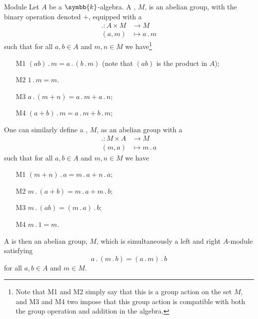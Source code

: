 \documentclass[fleqn]{NotesClass}
\renewcommand{\field}{\symbb{k}}
\newcommand{\action}{\mathbin{.}}
\begin{document}
    \begin{dfn}{Module}{}
        Let \(A\) be a \(\field\)-algebra.
        A , \(M\), is an abelian group, with the binary operation denoted \(+\), equipped with a 
        \begin{align}
            \action \colon A \times M &\to M\\
            (a, m) &\mapsto a \action m
        \end{align}
        such that for all \(a, b \in A\) and \(m, n \in M\) we have\footnote{Note that M1 and M2 simply say that this is a group action on the set \(M\), and M3 and M4 two impose that this group action is compatible with both the group operation and addition in the algebra.}
        \begin{itemize}
            \item[M1] \((ab)\action m = a\action (b\action m)\) (note that \((ab)\) is the product in \(A\));
            \item[M2] \(1 \action m = m\).
            \item[M3] \(a\action(m + n) = a\action m + a\action n\);
            \item[M4] \((a + b)\action m = a\action m + b\action m\);
        \end{itemize}
        
        One can similarly define a , \(M\), as an abelian group with a 
        \begin{align}
            \action \colon M \times A &\to M\\
            (m, a) &\mapsto m \action a
        \end{align}
        such that for all \(a, b \in A\) and \(m, n \in M\) we have
        \begin{itemize}
            \item[M1] \((m + n) \action a = m \action a + n \action a\);
            \item[M2] \(m \action (a + b) = m \action a + m \action b\);
            \item[M3] \(m \action (ab) = (m \action a) \action b\);
            \item[M4] \(m \action 1 = m\).
        \end{itemize}
        
        A  is then an abelian group, \(M\), which is simultaneously a left and right \(A\)-module satisfying
        \begin{equation}
            a \action (m \action b) = (a \action m) \action b
        \end{equation}
        for all \(a, b \in A\) and \(m \in M\).
    \end{dfn}
    
\end{document}
